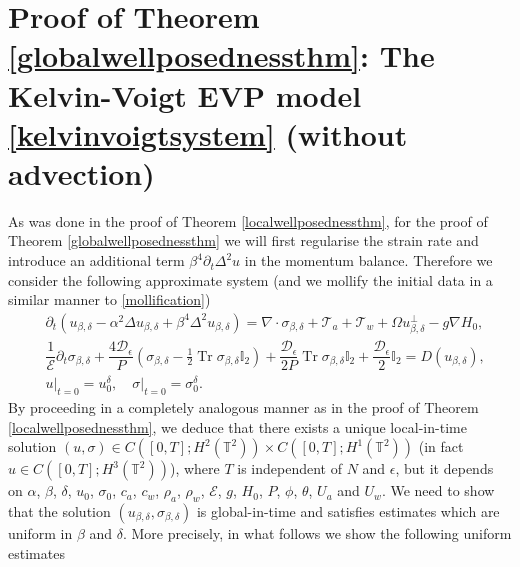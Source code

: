 \documentclass[12pt,a4paper]{article}
\theoremstyle{definition}
\theoremstyle{remark}
\numberwithin{equation}{section}
\DeclareMathOperator{\Tr}{Tr}
\begin{document}
\section{Proof of Theorem \ref{globalwellposednessthm}: The Kelvin-Voigt EVP model \eqref{kelvinvoigtsystem} (without advection)}
As was done in the proof of Theorem \ref{localwellposednessthm}, for the proof of Theorem \ref{globalwellposednessthm} we will first regularise the strain rate and introduce an additional term $\beta^4 \partial_t \Delta^2 u$ in the momentum balance. Therefore we consider the following approximate system (and we mollify the initial data in a similar manner to \eqref{mollification})
\begin{align}
&\partial_t (u_{\beta,\delta} - \alpha^2 \Delta u_{\beta,\delta} + \beta^4 \Delta^2 u_{\beta,\delta}) = \nabla \cdot \sigma_{\beta,\delta} + \mathcal{T}_a + \mathcal{T}_w + \Omega u_{\beta,\delta}^\perp - g \nabla H_0, \\
&\dfrac{1}{\mathcal E} \partial_t \sigma_{\beta,\delta} + \dfrac{4 \mathcal{D}_\epsilon}{P} (\sigma_{\beta,\delta} - \frac{1}{2} \Tr \sigma_{\beta,\delta} \mathbb I_2) + \dfrac{\mathcal{D}_\epsilon}{2P} \Tr \sigma_{\beta,\delta} \mathbb I_2 + \dfrac{\mathcal{D}_\epsilon}{2} \mathbb I_2  = D(u_{\beta,\delta}),
	\\
&u \lvert_{t = 0} = u_0^\delta, \quad \sigma \lvert_{t = 0} = \sigma_0^\delta.
\end{align}
By proceeding in a completely analogous manner as in the proof of Theorem \ref{localwellposednessthm}, we deduce that there exists a unique local-in-time solution $(u,\sigma) \in C([0,T];H^2 (\mathbb{T}^2)) \times C([0,T];H^1 (\mathbb{T}^2))$ (in fact $u \in C([0,T]; H^3 (\mathbb{T}^2))$), where $T$ is independent of $N$ and $\epsilon$, but it depends on $\alpha$, $\beta$, $\delta$, $u_0$, $\sigma_0$, $c_a$, $c_w$, $\rho_a$, $\rho_w$, $\mathcal{E}$, $g$, $H_0$, $P$, $\phi$, $\theta$, $U_a$ and $U_w$. We need to show that the solution $(u_{\beta,\delta},\sigma_{\beta,\delta})$ is global-in-time and satisfies estimates which are uniform in $\beta$ and $\delta$. More precisely, in what follows we show the following uniform estimates
\end{document}
